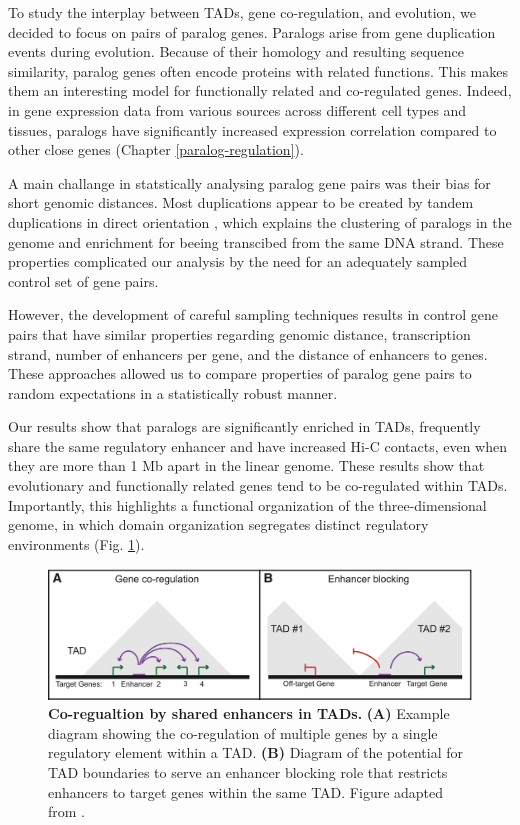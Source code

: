 \documentclass[a4paper,twoside=true,openright,parskip=full,chapterprefix=true,11pt,headings=normal,bibliography=totoc,listof=totoc,titlepage=on,captions=tableabove,draft=false]{scrreprt}
\theoremstyle{definition}
\theoremstyle{definition}
\theoremstyle{definition}
\theoremstyle{remark}
\begin{document}
To study the interplay between TADs, gene co-regulation, and evolution,
we decided to focus on pairs of paralog genes. Paralogs arise from gene
duplication events during evolution. Because of their homology and
resulting sequence similarity, paralog genes often encode proteins with
related functions. This makes them an interesting model for functionally
related and co-regulated genes. Indeed, in gene expression data from
various sources across different cell types and tissues, paralogs have
significantly increased expression correlation compared to other close
genes (Chapter \ref{paralog-regulation}).

A main challange in statstically analysing paralog gene pairs was their
bias for short genomic distances. Most duplications appear to be created
by tandem duplications in direct orientation \citep{Newman2015}, which
explains the clustering of paralogs in the genome and enrichment for
beeing transcibed from the same DNA strand. These properties complicated
our analysis by the need for an adequately sampled control set of gene
pairs.

However, the development of careful sampling techniques results in
control gene pairs that have similar properties regarding genomic
distance, transcription strand, number of enhancers per gene, and the
distance of enhancers to genes. These approaches allowed us to compare
properties of paralog gene pairs to random expectations in a
statistically robust manner.

Our results show that paralogs are significantly enriched in TADs,
frequently share the same regulatory enhancer and have increased Hi-C
contacts, even when they are more than 1 Mb apart in the linear genome.
These results show that evolutionary and functionally related genes tend
to be co-regulated within TADs. Importantly, this highlights a
functional organization of the three-dimensional genome, in which domain
organization segregates distinct regulatory environments (Fig.
\ref{fig:CoRegTAD}).

\begin{figure}

{\centering \includegraphics[width=0.8\linewidth]{figures/Dixon2016_Fig3ab} 

}

\caption{\textbf{Co-regualtion by shared enhancers in TADs.}
\textbf{(A)} Example diagram showing the co-regulation of multiple genes
by a single regulatory element within a TAD. \textbf{(B)} Diagram of the
potential for TAD boundaries to serve an enhancer blocking role that
restricts enhancers to target genes within the same TAD. Figure adapted
from \citep{Dixon2016}.}\label{fig:CoRegTAD}
\end{figure}
\end{document}
